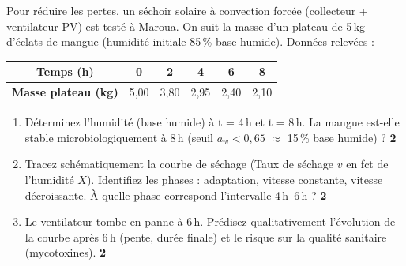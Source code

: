 \documentclass[11pt]{article}
\begin{document}
\begin{exercice}
Pour réduire les pertes, un séchoir solaire à convection forcée (collecteur + ventilateur PV) est testé à Maroua. On suit la masse d'un plateau de 5\,kg d'éclats de mangue (humidité initiale 85\,\% base humide). Données relevées :

\begin{center}
\begin{tabular}{|c|c|c|c|c|c|}
\hline
\textbf{Temps (h)} & 0 & 2 & 4 & 6 & 8 \\
\hline
\textbf{Masse plateau (kg)} & 5,00 & 3,80 & 2,95 & 2,40 & 2,10 \\
\hline
\end{tabular}
\end{center}

\begin{enumerate}
    \item Déterminez l'humidité (base humide) à t = 4\,h et t = 8\,h. La mangue est-elle stable microbiologiquement à 8\,h (seuil $a_w < 0,65$ $\approx$ 15\,\% base humide) ? \hfill\textbf{2}
    \item Tracez schématiquement la courbe de séchage (Taux de séchage $v$ en fct de l'humidité $X$). Identifiez les phases : adaptation, vitesse constante, vitesse décroissante. À quelle phase correspond l'intervalle 4\,h--6\,h ? \hfill\textbf{2}
    \item Le ventilateur tombe en panne à 6\,h. Prédisez qualitativement l'évolution de la courbe après 6\,h (pente, durée finale) et le risque sur la qualité sanitaire (mycotoxines). \hfill\textbf{2}
\end{enumerate}
\end{exercice}
\end{document}
